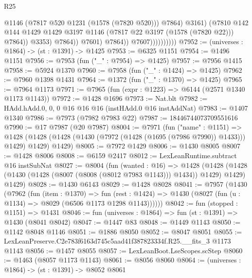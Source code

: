 \begin{lexlean}{R25}
\begin{coremodule}
                                          @1146
                                          (@7817 @520 @1231 (@1578 (@7820 @520)))
                                          @7864)
                                        @3161)
                                      (@7810
                                        @142
                                        @144
                                        @1429
                                        @1429
                                        @3197
                                        @1146
                                        (@7817 @22 @3197 (@1578 (@7820 @22)))
                                        @7864))
                                    @3353)
                                  @7864))
                              @7601)
                            @7864))
                        @7607))))))))))
@7952 := (universes : @1864) -> (st : @1391) -> @1425
@7953 := @6325 @1151
@7954 := @1496 @1151
@7956 := @7953 (fun ("_" : @7954) => @1425)
@7957 := @7956 @1415
@7958 := @5924 @1370
@7960 := @7958 (fun ("_" : @1424) => @1425)
@7962 := @7960 @1398 @1431
@7964 := @1372 (fun ("_" : @1370) => @1425)
@7965 := @7964 @1173
@7971 := @7965 (fun (expr : @1223) => @6144 (@2571 @1340 @1173 @1143))
@7972 := @1428 @1696
@7973 := Nat.blt
@7982 := HAdd.hAdd.{0, 0, 0} @16 @16 @16 (instHAdd.{0} @16 instAddNat)
@7983 := @1407 @1340
@7986 := @7973 (@7982 @7983 @22)
@7987 := 18446744073709551616
@7990 := @17 @7987 (@20 @7987)
@8004 := @7971
    (fun ("name" : @1151) =>
    @1428 (@1428 (@1428 (@1430 (@7972 (@1428 (@1695 (@7986 @7990)) @1433))) @1429) @1429) @1429)
@8005 := @7972 @1429
@8006 := @1430 @8005
@8007 := @1428 @8006
@8008 := @6159 @2417
@8012 := LexLeanRuntime.subtract @16 instSubNat
@8027 := @8004
    (fun (wanted : @16) =>
    @1428
      (@1428 (@1428 (@1430 (@1428 (@8007 (@8008 (@8012 @7983 @1143))) @1434)) @1429) @1429)
      @1429)
@8028 := @1430 @6143
@8029 := @1428 @8028
@8041 := @7957
    (@1430
      (@7962
        (fun (item : @1370) =>
        fun (rest : @1424) => @1430 (@8027 (fun (u : @1134) => @8029 (@6506 @1173 @1298 @1143))))))
@8042 := fun (stopped : @1151) => @1431
@8046 := fun (universes : @1864) => fun (st : @1391) => @1430 (@8041 @8042)
@8047 := @1447 @83
@8048 := @1449 @1143
@8050 := @1142 @8048 @1146
@8051 := @1886 @8050
@8052 := @8047 @8051
@8055 := LexLeanPreserve.C2e783f6163d745c5aad41f387823334f.R25.__fits_3 @1173 @1143
@8056 := @1457 @8055
@8057 := LexLeanBoot.LseScopes.scStep
@8060 := @1463 (@8057 @1173 @1143)
@8061 := @8056 @8060
@8064 := (universes : @1864) -> (st : @1391) -> @8052 @8061

\end{coremodule}
\end{lexlean}
